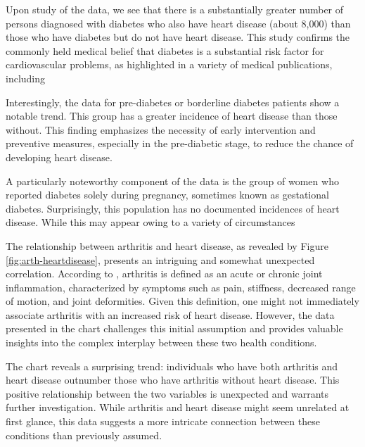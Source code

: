 \documentclass[12pt, a4paper,twoside]{report}
\numberwithin{equation}{chapter}
\begin{document}
Upon study of the data, we see that there is a substantially greater number of persons diagnosed with diabetes who also have heart disease (about 8,000) than those who have diabetes but do not have heart disease. This study confirms the commonly held medical belief that diabetes is a substantial risk factor for cardiovascular problems, as highlighted in a variety of medical publications, including \parencite{national-institute-of-diabetes}

Interestingly, the data for pre-diabetes or borderline diabetes patients show a notable trend. This group has a greater incidence of heart disease than those without. This finding emphasizes the necessity of early intervention and preventive measures, especially in the pre-diabetic stage, to reduce the chance of developing heart disease.

A particularly noteworthy component of the data is the group of women who reported diabetes solely during pregnancy, sometimes known as gestational diabetes. Surprisingly, this population has no documented incidences of heart disease. While this may appear owing to a variety of circumstances



The relationship between arthritis and heart disease, as revealed by Figure \ref{fig:arth-heartdisease}, presents an intriguing and somewhat unexpected correlation. According to \parencite{Senthelal}, arthritis is defined as an acute or chronic joint inflammation, characterized by symptoms such as pain, stiffness, decreased range of motion, and joint deformities. Given this definition, one might not immediately associate arthritis with an increased risk of heart disease. However, the data presented in the chart challenges this initial assumption and provides valuable insights into the complex interplay between these two health conditions.

The chart reveals a surprising trend: individuals who have both arthritis and heart disease outnumber those who have arthritis without heart disease. This positive relationship between the two variables is unexpected and warrants further investigation. While arthritis and heart disease might seem unrelated at first glance, this data suggests a more intricate connection between these conditions than previously assumed.
\end{document}
